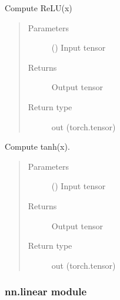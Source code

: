 \documentclass[letterpaper,10pt,english,openany,oneside]{sphinxmanual}
\begin{document}

\begin{fulllineitems}
\label{\detokenize{nn:nn.functional.relu}}
Compute ReLU(x)
\begin{quote}\begin{description}
\item[{Parameters}] \leavevmode
{} () \textendash{} Input tensor

\item[{Returns}] \leavevmode
Output tensor

\item[{Return type}] \leavevmode
out (torch.tensor)

\end{description}\end{quote}

\end{fulllineitems}


\begin{fulllineitems}
\label{\detokenize{nn:nn.functional.tanh}}
Compute tanh(x).
\begin{quote}\begin{description}
\item[{Parameters}] \leavevmode
{} () \textendash{} Input tensor

\item[{Returns}] \leavevmode
Output tensor

\item[{Return type}] \leavevmode
out (torch.tensor)

\end{description}\end{quote}

\end{fulllineitems}



\subsubsection{nn.linear module}
\label{\detokenize{nn:module-nn.linear}}\label{\detokenize{nn:nn-linear-module}}
\end{document}
